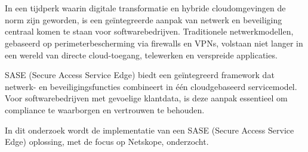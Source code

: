 
\chapter{}%
\label{ch:inleiding}



In een tijdperk waarin digitale transformatie en hybride cloudomgevingen de norm zijn geworden, is een geïntegreerde aanpak van netwerk en beveiliging centraal komen te staan voor softwarebedrijven. 
Traditionele netwerkmodellen, gebaseerd op perimeterbescherming via firewalls en VPNs, volstaan niet langer in een wereld van directe cloud-toegang, telewerken en verspreide applicaties. 

\vspace{2ex}

SASE (Secure Access Service Edge) biedt een geïntegreerd framework dat netwerk- en beveiligingsfuncties combineert in één cloudgebaseerd servicemodel. Voor softwarebedrijven met gevoelige klantdata, is deze aanpak essentieel om compliance te waarborgen en vertrouwen te behouden.

\vspace{2ex}

In dit onderzoek wordt de implementatie van een SASE (Secure Access Service Edge) oplossing, met de focus op Netskope, onderzocht.
